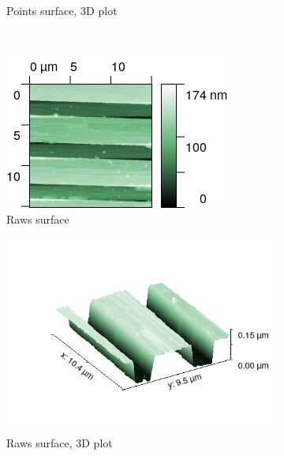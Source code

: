 \documentclass[11pt,a4paper]{article}
\begin{document}
\begin{figure}[H]
\begin{subfigure}[b]{0.45\textwidth}
\caption{Points surface, 3D plot}
\label{fig:sm_raws}
\end{subfigure}\\\vspace{.2cm}
\begin{subfigure}[b]{0.45\textwidth}
\includegraphics[width=\textwidth]{tm_raws}
\caption{Raws surface}
\label{fig:}
\end{subfigure}
\begin{subfigure}[b]{0.45\textwidth}
\includegraphics[width=\textwidth]{tm_raws_3D}
\caption{Raws surface, 3D plot}
\label{fig:}
\end{subfigure}\\\vspace{.2cm}
\begin{subfigure}[b]{0.45\textwidth}

\end{subfigure}
\end{figure}
\end{document}
